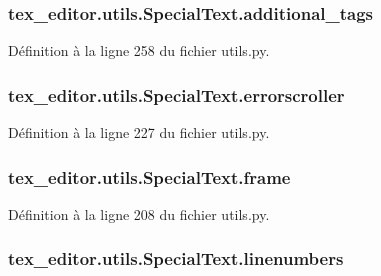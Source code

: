 \subsubsection[{additional\+\_\+tags}]{\setlength{\rightskip}{0pt plus 5cm}tex\+\_\+editor.\+utils.\+Special\+Text.\+additional\+\_\+tags}\label{classtex__editor_1_1utils_1_1_special_text_a6a3b266f1363705b2b96e2430a60621d}


Définition à la ligne 258 du fichier utils.\+py.

\hypertarget{classtex__editor_1_1utils_1_1_special_text_a7cbbcc511806669887afff4e53bc7d1a}{}
\subsubsection[{errorscroller}]{\setlength{\rightskip}{0pt plus 5cm}tex\+\_\+editor.\+utils.\+Special\+Text.\+errorscroller}\label{classtex__editor_1_1utils_1_1_special_text_a7cbbcc511806669887afff4e53bc7d1a}


Définition à la ligne 227 du fichier utils.\+py.

\hypertarget{classtex__editor_1_1utils_1_1_special_text_a92e99a123af2b93e7b7bb69585240f13}{}
\subsubsection[{frame}]{\setlength{\rightskip}{0pt plus 5cm}tex\+\_\+editor.\+utils.\+Special\+Text.\+frame}\label{classtex__editor_1_1utils_1_1_special_text_a92e99a123af2b93e7b7bb69585240f13}


Définition à la ligne 208 du fichier utils.\+py.

\hypertarget{classtex__editor_1_1utils_1_1_special_text_ab0eb81132ed588c16c3561a8b726619f}{}
\subsubsection[{linenumbers}]{\setlength{\rightskip}{0pt plus 5cm}tex\+\_\+editor.\+utils.\+Special\+Text.\+linenumbers}\label{classtex__editor_1_1utils_1_1_special_text_ab0eb81132ed588c16c3561a8b726619f}


